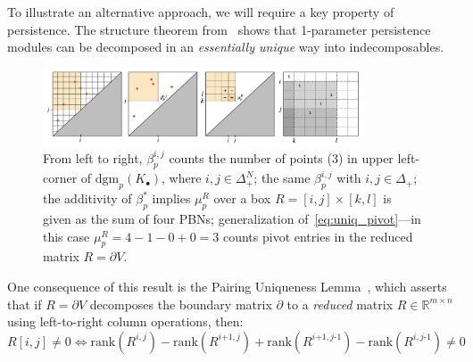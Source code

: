 \documentclass[12pt]{article}
\numberwithin{equation}{section}
\newcommand{\+}{%
	\raisebox{0.18ex}{\scaleobj{0.55}{+}}
}
\theoremstyle{definition}
\begin{document}
To illustrate an alternative approach, we will require a key property of persistence. The structure theorem from~\cite{zomorodian2004computing} shows that 1-parameter persistence modules can be decomposed in an \emph{essentially unique} way into indecomposables.
\begin{figure}
\centering
	\includegraphics[width=0.85\textwidth]{betti_add}
	\caption{From left to right, $\beta_p^{i,j}$ counts the number of points (3) in upper left-corner of $\mathrm{dgm}_p(K_\bullet)$, where $i,j \in \Delta_+^N$; the same $\beta_p^{i,j}$  with $i,j \in \Delta_+$; the additivity of $\beta_p^{\ast}$ implies $\mu_p^{R}$ over a box $R=[i,j] \times [k,l]$ is given as the sum of four PBNs; generalization of~\ref{eq:uniq_pivot}---in this case $\mu_p^R = 4 - 1 - 0 + 0 = 3$ counts pivot entries in the reduced matrix $R = \partial V$.}
	\label{fig:mult}
\end{figure}
 One consequence of this result is the Pairing Uniqueness Lemma~\cite{edelsbrunner2000topological}, which asserts that if $R = \partial V$ decomposes the boundary matrix $\partial$ to a \emph{reduced} matrix $R \in \mathbb{R}^{m \times n}$ using left-to-right column operations, then:
\begin{equation}\label{eq:uniq_pivot}
R[i,j] \neq 0 \Leftrightarrow \mathrm{rank}(R^{i,j}) - \mathrm{rank}(R^{i\texttt{+}1,j}) + \mathrm{rank}(R^{i\texttt{+}1,j\text{-}1}) - \mathrm{rank}(R^{i,j\text{-}1}) \neq 0 
\end{equation}
\end{document}
